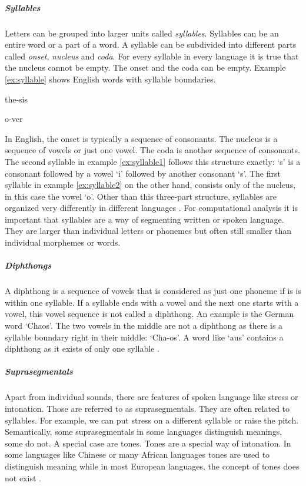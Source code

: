 \subparagraph{Syllables} Letters can be grouped into larger units called \textit{syllables}. Syllables can be an entire word or a part of a word. A syllable can be subdivided into different parts called \textit{onset}, \textit{nucleus} and \textit{coda}. For every syllable in every language it is true that the nucleus cannot be empty. The onset and the coda can be empty. Example \ref{ex:syllable} shows English words with syllable boundaries.
\begin{covsubexamples}[preamble={English syllables: the hyphen denotes a syllable boundary.}]
\label{ex:syllable}
\item \label{ex:syllable1} the-sis
\item \label{ex:syllable2} o-ver
\end{covsubexamples}
In English, the onset is typically a sequence of consonants. The nucleus is a sequence of vowels or just one vowel. The coda is another sequence of consonants. The second syllable in example \ref{ex:syllable1} follows this structure exactly: `s' is a consonant followed by a vowel `i' followed by another consonant `s'. The first syllable in example \ref{ex:syllable2} on the other hand, consists only of the nucleus, in this case the vowel `o'. Other than this three-part structure, syllables are organized very differently in different languages \citep{Intro.2007}. For computational analysis it is important that syllables are a way of segmenting written or spoken language. They are larger than individual letters or phonemes but often still smaller than individual morphemes or words. 

\subparagraph{Diphthongs}
A diphthong is a sequence of vowels that is considered as just one phoneme if is is within one syllable. If a syllable ends with a vowel and the next one starts with a vowel, this vowel sequence is not called a diphthong. An example is the German word `Chaos'. The two vowels in the middle are not a diphthong as there is a syllable boundary right in their middle: `Cha-os'. A word like `aus' contains a diphthong as it exists of only one syllable \citep{Intro.2007}. 

\subparagraph{Suprasegmentals} Apart from individual sounds, there are features of spoken language like stress or intonation. Those are referred to as suprasegmentals. They are often related to syllables. For example, we can put stress on a different syllable or raise the pitch. Semantically, some suprasegmentals in some languages distinguish meanings, some do not. A special case are tones. Tones are a special way of intonation. In some languages like Chinese or many African languages tones are used to distinguish meaning while in most European languages, the concept of tones does not exist \citep{Intro.2007}.

